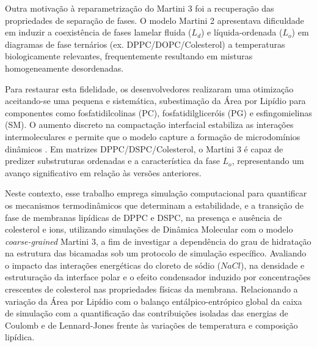 Outra motivação à reparametrização do Martini 3 foi a recuperação das propriedades de separação de fases. O modelo Martini 2 apresentava dificuldade em induzir a coexistência de fases lamelar fluida ($L_d$) e líquida-ordenada ($L_o$) em diagramas de fase ternários (ex. DPPC/DOPC/Colesterol) a temperaturas biologicamente relevantes, frequentemente resultando em misturas homogeneamente desordenadas.

Para restaurar esta fidelidade, os desenvolvedores realizaram uma otimização aceitando-se uma pequena e sistemática, subestimação da Área por Lipídio para componentes como fosfatidilcolinas (PC), fosfatidilgliceróis (PG) e esfingomielinas (SM). O aumento discreto na compactação interfacial estabiliza as interações intermoleculares e permite que o modelo capture a formação de microdomínios dinâmicos \cite{pedersen2025}. Em matrizes DPPC/DSPC/Colesterol, o Martini 3 é capaz de predizer substruturas ordenadas e a característica da fase $L_o$, representando um avanço significativo em relação às versões anteriores.

Neste contexto, esse trabalho emprega simulação computacional para quantificar os mecanismos termodinâmicos que determinam a estabilidade, e a transição de fase de membranas lipídicas de DPPC e DSPC, na presença e ausência de colesterol e ions, utilizando simulações de Dinâmica Molecular com o modelo \textit{coarse-grained} Martini 3, a fim de investigar a dependência do grau de hidratação na estrutura das bicamadas sob um protocolo de simulação específico. Avaliando o impacto das interações energéticas do cloreto de sódio ($NaCl$), na densidade e estruturação da interface polar e o efeito condensador induzido por concentrações crescentes de colesterol nas propriedades físicas da membrana. Relacionando a variação da Área por Lipídio com o balanço entálpico-entrópico global da caixa de simulação com a quantificação das contribuições isoladas das energias de Coulomb e de Lennard-Jones frente às variações de temperatura e composição lipídica.

